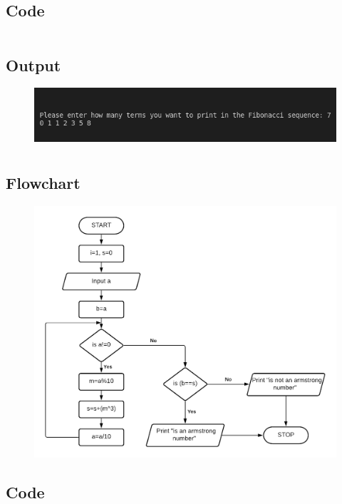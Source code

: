 \documentclass[12pt]{article}
\begin{document}
\subsection{Code}
\inputminted{c}{q3.c}
\subsection{Output}
\begin{figure}[h]
    \centering
    \includegraphics[width=1.05\textwidth]{3.png}
\end{figure}
\newpage
\section{}
\subsection{Flowchart}
\begin{figure}[h]
    \centering
    \includegraphics[width=1.1\textwidth]{Flowchart04.png}
\end{figure}
\newpage
\subsection{Code}
\inputminted{c}{q4.c}
\end{document}
